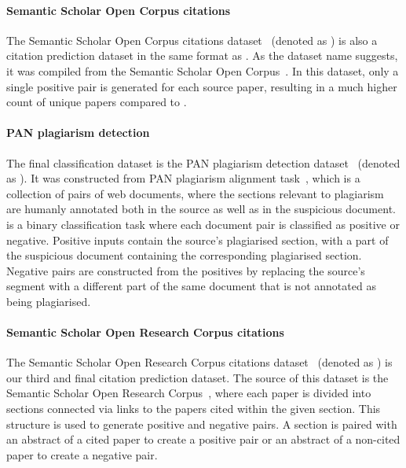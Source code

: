 \paragraph{Semantic Scholar Open Corpus citations} The Semantic Scholar Open
Corpus citations dataset~\citep{zhou2020multilevel} (denoted as ) is
also a citation prediction dataset in the same format as . As the
dataset name suggests, it was compiled from the Semantic Scholar Open
Corpus~\citep{bhagavatula2018content}. In this dataset, only a single positive
pair is generated for each source paper, resulting in a much higher count of
unique papers compared to .

\paragraph{PAN plagiarism detection} The final classification dataset is the
PAN plagiarism detection dataset~\citep{zhou2020multilevel} (denoted as
). It was constructed from PAN plagiarism alignment
task~\citep{potthast2013overview}, which is a collection of pairs of web
documents, where the sections relevant to plagiarism are humanly annotated both
in the source as well as in the suspicious document.  is a binary
classification task where each document pair is classified as positive or
negative. Positive inputs contain the source's plagiarised section, with a part of
the suspicious document containing the corresponding plagiarised section.
Negative pairs are constructed from the positives by replacing the source's
segment with a different part of the same document that is not annotated as being
plagiarised.

\paragraph{Semantic Scholar Open Research Corpus citations} The Semantic
Scholar Open Research Corpus citations dataset~\citep{zhou2020multilevel}
(denoted as ) is our third and final citation prediction dataset.
The source of this dataset is the Semantic Scholar Open Research
Corpus~\citep{lo2019s2orc}, where each paper is divided into sections
connected via links to the papers cited within the given section. This structure is
used to generate positive and negative pairs. A section is paired with an
abstract of a cited paper to create a positive pair or an abstract of
a non-cited paper to create a negative pair.


